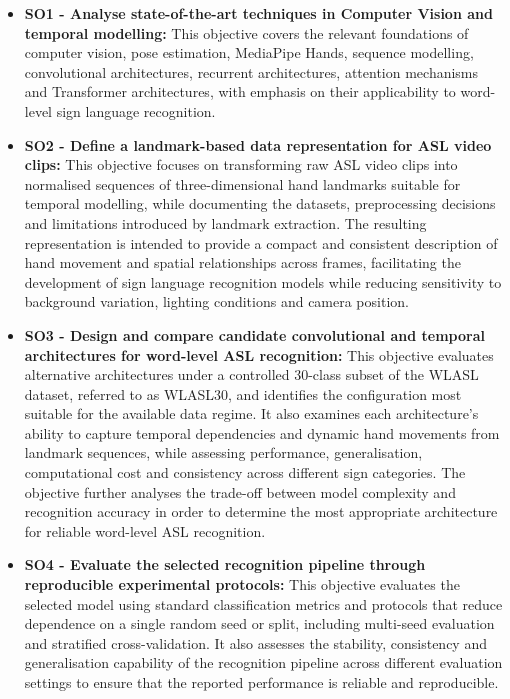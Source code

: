\begin{itemize}
    \item \textbf{SO1 - Analyse state-of-the-art techniques in Computer Vision and temporal modelling:} This objective covers the relevant foundations of computer vision, pose estimation, MediaPipe Hands, sequence modelling, convolutional architectures, recurrent architectures, attention mechanisms and Transformer architectures, with emphasis on their applicability to word-level sign language recognition.

    \item \textbf{SO2 - Define a landmark-based data representation for ASL video clips:} This objective focuses on transforming raw ASL video clips into normalised sequences of three-dimensional hand landmarks suitable for temporal modelling, while documenting the datasets, preprocessing decisions and limitations introduced by landmark extraction. The resulting representation is intended to provide a compact and consistent description of hand movement and spatial relationships across frames, facilitating the development of sign language recognition models while reducing sensitivity to background variation, lighting conditions and camera position.

    \item \textbf{SO3 - Design and compare candidate convolutional and temporal architectures for word-level ASL recognition:} This objective evaluates alternative architectures under a controlled 30-class subset of the WLASL dataset, referred to as WLASL30, and identifies the configuration most suitable for the available data regime. It also examines each architecture's ability to capture temporal dependencies and dynamic hand movements from landmark sequences, while assessing performance, generalisation, computational cost and consistency across different sign categories. The objective further analyses the trade-off between model complexity and recognition accuracy in order to determine the most appropriate architecture for reliable word-level ASL recognition.

    \item \textbf{SO4 - Evaluate the selected recognition pipeline through reproducible experimental protocols:} This objective evaluates the selected model using standard classification metrics and protocols that reduce dependence on a single random seed or split, including multi-seed evaluation and stratified cross-validation. It also assesses the stability, consistency and generalisation capability of the recognition pipeline across different evaluation settings to ensure that the reported performance is reliable and reproducible.


\end{itemize}
